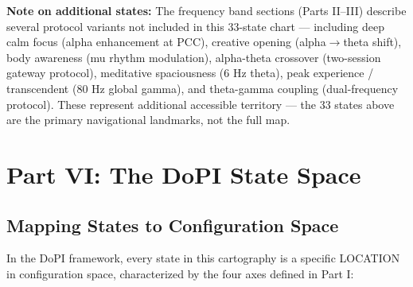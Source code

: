 


\textbf{Note on additional states:} The frequency band sections (Parts II–III) describe several protocol variants not included in this 33-state chart — including deep calm focus (alpha enhancement at PCC), creative opening (alpha$\rightarrow$theta shift), body awareness (mu rhythm modulation), alpha-theta crossover (two-session gateway protocol), meditative spaciousness (6 Hz theta), peak experience / transcendent (80 Hz global gamma), and theta-gamma coupling (dual-frequency protocol). These represent additional accessible territory — the 33 states above are the primary navigational landmarks, not the full map.


\bigskip\noindent\makebox[\textwidth]{\color{rulegray}\rule{5cm}{0.3pt}}\bigskip


\section*{Part VI: The DoPI State Space}


\subsection*{Mapping States to Configuration Space}


In the DoPI framework, every state in this cartography is a specific LOCATION in configuration space, characterized by the four axes defined in Part I:


